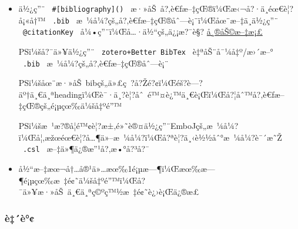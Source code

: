 \begin{itemize}
\begin{Shaded}
\begin{Highlighting}[]
\FunctionTok{\{}
    \FunctionTok{:}\OtherTok{[}\OtherTok{,} \OtherTok{,} \OtherTok{]}\FunctionTok{,}
    \FunctionTok{:}\OtherTok{[}\OtherTok{,} \OtherTok{,} \OtherTok{]}
\FunctionTok{\}}
\end{Highlighting}
\end{Shaded}

\begin{Shaded}
\begin{Highlighting}[]
\end{Highlighting}
\end{Shaded}
\item
  ä½¿ç''¨ \texttt{\ \#{[}bibliography{]}()\ }
  æ·»åŠ~å?‚è€ƒæ--‡çŒ®ï¼Œæ‹¬å?·ä¸­éœ€è¦?å¡«å†™ \texttt{\ .bib\ }
  æ~¼å¼?çš„å?‚è€ƒæ--‡çŒ®åˆ---è¡¨ï¼Œåœ¨æ--‡ä¸­ä½¿ç''¨
  \texttt{\ @citationKey\ } å¼•ç''¨ï¼Œå\ldots·ä½``çš„ä¿¡æ?¯è§?
  \href{https://typst.app/docs/reference/model/bibliography/}{å¸®åŠ©æ--‡æ¡£}

  PSï¼šå?¯ä»¥ä½¿ç''¨ \texttt{\ zotero+Better\ BibTex\ }
  è‡ªåŠ¨å¯¼å‡º/æ›´æ--° \texttt{\ .bib\ } æ~¼å¼?çš„å?‚è€ƒæ--‡çŒ®åˆ---è¡¨

  PSï¼šåœ¨æ·»åŠ~bibçš„ä»£ç~?å?Žé?¢ï¼Œéš?è---?äº†ä¸€ä¸ªheadingï¼Œè¯·ä¸?è¦?åˆ~é™¤è¿™ä¸€è¡Œï¼Œå?¦åˆ™å?‚è€ƒæ--‡çŒ®çš„é¡µçœ‰ä¼šå‡ºé''™

  PSï¼šæ~¹æ?®å­¦é™¢è¦?æ±‚é»˜è®¤ä½¿ç''¨EmboJçš„æ~¼å¼?ï¼Œå¦‚æžœéœ€è¦?å\ldots¶ä»--æ~¼å¼?ï¼Œå?ªè¦?ä¸‹è½½åˆ°æ~¼å¼?è¯´æ˜Ž
  \texttt{\ .csl\ } æ--‡ä»¶ä¿®æ''¹å?‚æ•°å?³å?¯
\item
  å½``æ--‡æœ¬å†\ldots å®¹ä»\ldots æœ‰1é¡µæ---¶ï¼Œæœ‰æ---¶é¡µçœ‰æ~‡é¢˜ä¼šå‡ºé''™ï¼Œå?¯ä»¥æ·»åŠ~ä¸€ä¸ªç©ºç™½æ~‡é¢˜è¿›è¡Œä¿®æ­£

\begin{Shaded}
\begin{Highlighting}[]
\end{Highlighting}
\end{Shaded}
\end{itemize}

\subsubsection{è‡´è°¢}\label{uxe8uxe8}

